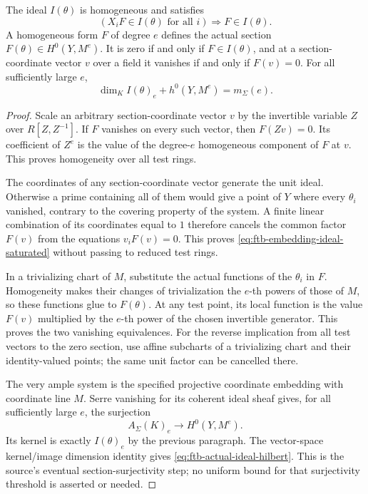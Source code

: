 \begin{lemma}
\label{lem:ftb-theta-embedding-ideal}
The ideal \(I(\theta)\) is homogeneous and satisfies
\[
                   (X_iF\in I(\theta)\text{ for all }i)
                                      \Longrightarrow F\in I(\theta).
 \tag{TF2}\label{eq:ftb-embedding-ideal-saturated}
\]
A homogeneous form \(F\) of degree \(e\) defines the actual
section \(F(\theta)\in H^0(Y,M^e)\).
It is zero if and only if \(F\in I(\theta)\), and at a
section-coordinate vector \(v\) over a field it vanishes
if and only if \(F(v)=0\).
For all sufficiently large \(e\),
\[
            \dim_K I(\theta)_e+h^0(Y,M^e)=m_\Sigma(e).
 \tag{TF3}\label{eq:ftb-actual-ideal-hilbert}
\]
\end{lemma}
\begin{proof}
Scale an arbitrary section-coordinate vector \(v\) by
the invertible variable \(Z\) over \(R[Z,Z^{-1}]\).
If \(F\) vanishes on every such vector, then
\(F(Zv)=0\).
Its coefficient of \(Z^e\) is the value of the
degree-\(e\) homogeneous component of \(F\) at \(v\).
This proves homogeneity over all test rings.

The coordinates of any section-coordinate vector
generate the unit ideal.
Otherwise a prime containing all of them would give a
point of \(Y\) where every \(\theta_i\) vanished, contrary
to the covering property of the system.
A finite linear combination of its coordinates equal
to \(1\) therefore cancels the common factor \(F(v)\)
from the equations \(v_iF(v)=0\).
This proves \eqref{eq:ftb-embedding-ideal-saturated}
without passing to reduced test rings.

In a trivializing chart of \(M\), substitute the actual
functions of the \(\theta_i\) in \(F\).
Homogeneity makes their changes of trivialization the
\(e\)-th powers of those of \(M\), so these functions
glue to \(F(\theta)\).
At any test point, its local function is the value
\(F(v)\) multiplied by the \(e\)-th power of the
chosen invertible generator.
This proves the two vanishing equivalences.
For the reverse implication from all test vectors to
the zero section, use affine subcharts of a
trivializing chart and their identity-valued points;
the same unit factor can be cancelled there.

The very ample system is the specified projective
coordinate embedding with coordinate line \(M\).
Serre vanishing for its coherent ideal sheaf gives,
for all sufficiently large \(e\), the surjection
\[
                        A_\Sigma(K)_e\longrightarrow H^0(Y,M^e).
\]
Its kernel is exactly \(I(\theta)_e\) by the previous
paragraph.
The vector-space kernel/image dimension identity gives
\eqref{eq:ftb-actual-ideal-hilbert}.
This is the source's eventual section-surjectivity step;
no uniform bound for that surjectivity threshold is
asserted or needed.
\end{proof}

